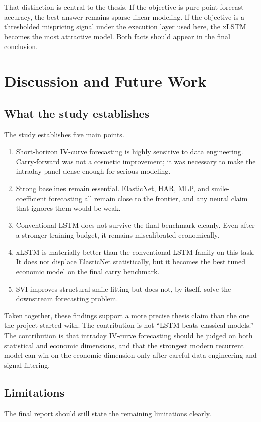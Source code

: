 \documentclass[12pt]{report}
\begin{document}
That distinction is central to the thesis. If the objective is pure point forecast accuracy, the best answer remains sparse linear modeling. If the objective is a thresholded mispricing signal under the execution layer used here, the xLSTM becomes the most attractive model. Both facts should appear in the final conclusion.

\chapter{Discussion and Future Work}

\section{What the study establishes}
The study establishes five main points.

\begin{enumerate}[leftmargin=1.3cm]
    \item Short-horizon IV-curve forecasting is highly sensitive to data engineering. Carry-forward was not a cosmetic improvement; it was necessary to make the intraday panel dense enough for serious modeling.
    \item Strong baselines remain essential. ElasticNet, HAR, MLP, and smile-coefficient forecasting all remain close to the frontier, and any neural claim that ignores them would be weak.
    \item Conventional LSTM does not survive the final benchmark cleanly. Even after a stronger training budget, it remains miscalibrated economically.
    \item xLSTM is materially better than the conventional LSTM family on this task. It does not displace ElasticNet statistically, but it becomes the best tuned economic model on the final carry benchmark.
    \item SVI improves structural smile fitting but does not, by itself, solve the downstream forecasting problem.
\end{enumerate}

Taken together, these findings support a more precise thesis claim than the one the project started with. The contribution is not ``LSTM beats classical models.'' The contribution is that intraday IV-curve forecasting should be judged on both statistical and economic dimensions, and that the strongest modern recurrent model can win on the economic dimension only after careful data engineering and signal filtering.

\section{Limitations}
The final report should still state the remaining limitations clearly.
\end{document}
